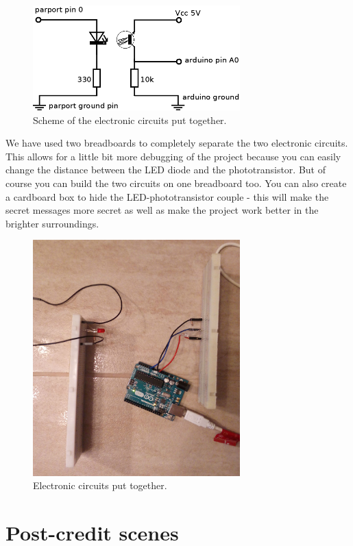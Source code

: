 \documentclass[12pt]{report}
\begin{document}
\begin{figure}[H]
\centering\includegraphics[width=8cm]{scheme}
\caption{Scheme of the electronic circuits put together.}				
\label{fig:circuits}
\end{figure}

We have used two breadboards to completely separate the two electronic circuits. This allows for a little bit more debugging of the project because you can easily change the distance between the LED diode and the phototransistor. But of course you can build the two circuits on one breadboard too. You can also create a cardboard box to hide the LED-phototransistor couple - this will make the secret messages more secret as well as make the project work better in the brighter surroundings.

\begin{figure}[H]
\centering\includegraphics[width=8cm]{circuits}
\caption{Electronic circuits put together.}				
\label{fig:circuits_pic}
\end{figure}



\chapter{Post-credit scenes}
\end{document}
